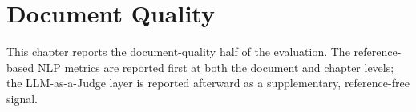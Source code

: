 \chapter{Document Quality}
\label{ch:docquality}

This chapter reports the document-quality half of the evaluation.
The reference-based NLP metrics are reported first at both the
document and chapter levels; the LLM-as-a-Judge layer is reported
afterward as a supplementary, reference-free signal.




